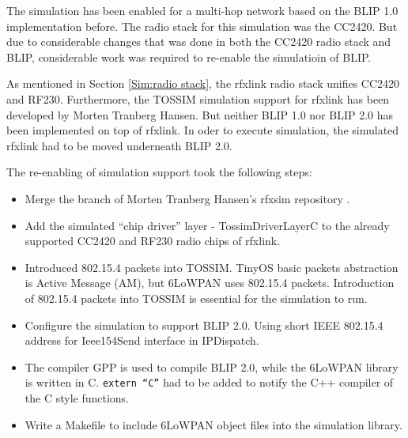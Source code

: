 The simulation has been enabled for a multi-hop network based on the BLIP 1.0 implementation before. The radio stack for this simulation was the CC2420. But due to considerable changes that was done in both the CC2420 radio stack and BLIP, considerable work was required to re-enable the simulatioin of BLIP. 
\newline

As mentioned in Section \ref{Sim:radio stack}, the rfxlink radio stack unifies CC2420 and RF230. Furthermore, the TOSSIM simulation support for rfxlink has been developed by Morten Tranberg Hansen. But neither BLIP 1.0 nor BLIP 2.0 has been implemented on top of rfxlink. In oder to execute simulation, the simulated rfxlink had to be moved underneath BLIP 2.0. 
\newline

The re-enabling of simulation support took the following steps: 
\begin{itemize}
\item Merge the branch of Morten Tranberg Hansen's rfxsim repository \cite{rfxsim}. 
\newline

\item Add the simulated ``chip driver'' layer - TossimDriverLayerC to the already supported CC2420 and RF230 radio chips of rfxlink. 
\newline

\item Introduced 802.15.4 packets into TOSSIM. TinyOS basic packets abstraction is Active Message (AM), but 6LoWPAN uses 802.15.4 packets. Introduction of 802.15.4 packets into TOSSIM is essential for the simulation to run.
\newline

\item Configure the simulation to support BLIP 2.0. Using short IEEE 802.15.4 address for Ieee154Send interface in IPDispatch. 
\newline

\item The compiler GPP is used to compile BLIP 2.0, while the 6LoWPAN library is written in C. \texttt{extern ``C''} had to be added to notify the C++ compiler of the C style functions.
\newline

\item Write a Makefile to include 6LoWPAN object files into the simulation library.
\end{itemize}

